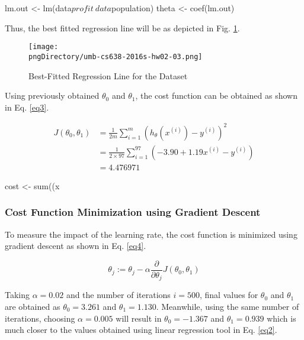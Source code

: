 \documentclass[12pt,letterpaper,twoside]{article}
\begin{document}
\begin{terminal}
lm.out <- lm(data$profit ~ data$population)
theta <- coef(lm.out)
\end{terminal}

Thus, the best fitted regression line will be as depicted in Fig. \ref{fig2}.

\begin{figure}[H]\centering
\texttt{[image: \\pngDirectory/umb-cs638-2016s-hw02-03.png]}
\caption{Best-Fitted Regression Line for the Dataset}\label{fig2}
\end{figure}

Using previously obtained $\theta_0$ and $\theta_1$, the cost function can be obtained as shown in Eq. \ref{eq3}.

\begin{equation}\label{eq3}
\begin{split}
J(\theta_0, \theta_1) & = \frac{1}{2m}\sum\limits_{i=1}^m \left(h_{\theta}(x^{(i)})-y^{(i)}\right)^{2} \\
 & = \frac{1}{2 \times 97}\sum\limits_{i=1}^{97} \left({-3.90} + {1.19}x^{(i)} - y^{(i)}\right)\\
 & = 4.476971
\end{split}
\end{equation}

\begin{terminal}
cost <- sum((x%
\end{terminal}

\subsubsection*{Cost Function Minimization using Gradient Descent}

To measure the impact of the learning rate, the cost function is minimized using gradient descent as shown in Eq. \ref{eq4}.

\begin{equation}\label{eq4}
\theta_j := \theta_j - \alpha \frac{\partial}{\partial\theta_j}J(\theta_0, \theta_1)
\end{equation}

Taking $\alpha = 0.02$ and the number of iterations $i = 500$, final values for $\theta_0$ and $\theta_1$ are obtained as $\theta_0 = 3.261$ and $\theta_1 = 1.130$.
Meanwhile, using the same number of iterations, choosing $\alpha = 0.005$ will result in $\theta_0 = -1.367$ and $\theta_1 = 0.939$ which is much closer to the values obtained using linear regression tool in Eq. \ref{eq2}.
\end{document}
